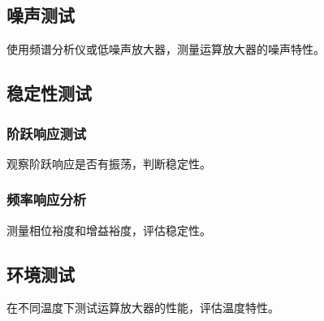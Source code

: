 \subsection{噪声测试}

使用频谱分析仪或低噪声放大器，测量运算放大器的噪声特性。

\subsection{稳定性测试}

\subsubsection{阶跃响应测试}

观察阶跃响应是否有振荡，判断稳定性。

\subsubsection{频率响应分析}

测量相位裕度和增益裕度，评估稳定性。

\subsection{环境测试}

在不同温度下测试运算放大器的性能，评估温度特性。
